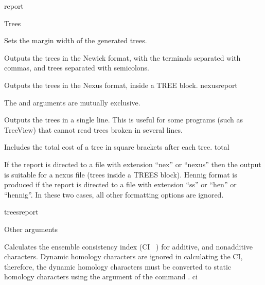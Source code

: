 \begin{command}{report}{}
\begin{arguments}
\begin{argumentgroup}{Trees}
{\begin{description}
                        {Sets the margin width of the generated trees.}
                        {}

                        {Outputs the trees in the Newick format, with the
                        terminals separated with commas, and trees separated
                        with semicolons.}
                        {}
                    
                        {Outputs the trees in the Nexus format, inside a TREE block.}
                        {nexusreport}
                
                    \begin{statement}
                        The  and  arguments are 
                        mutually exclusive.
                    \end{statement}
     
                        {Outputs the trees in a single line. This is useful for
                        some programs (such as TreeView) that cannot read
                        trees broken in several lines.}
                        {}
                              
                        {Includes the total cost of a tree in square brackets after each tree.}
                        {total}
                \end{description}
            If the report is directed
            to a file with extension ``nex'' or ``nexus'' then
            the output is suitable for a nexus file (trees inside a TREES
            block). Hennig format is produced if the report is directed
            to a file with extension ``ss'' or ``hen'' or ``hennig''. In
            these two cases, all other formatting options are ignored.}
            {treesreport}

        \end{argumentgroup}

        \begin{argumentgroup}{Other arguments}
            {} 

                {Calculates the ensemble consistency index (CI ~\cite{farris1989,
                klugeandfarris1969}) for additive, and nonadditive
                characters. Dynamic homology characters are ignored in calculating
                the CI, therefore, the dynamic homology characters must be converted
                to static homology characters using the argument  
                of the command .}
                {ci}
      

\end{argumentgroup}
\end{arguments}
\end{command}
